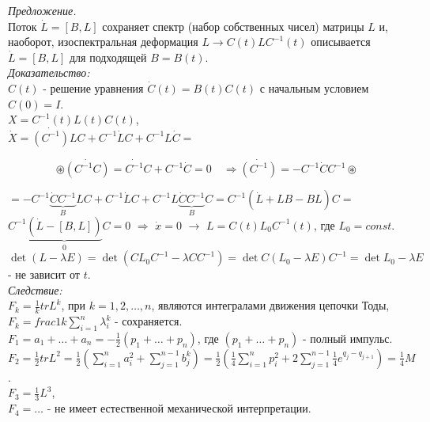 \documentclass[a4paper,12pt]{article}
\theoremstyle{definition}
\theoremstyle{definition}
\theoremstyle{definition}
\begin{document}
\textit{Предложение.}\\

Поток $\dot{L} = [B,L]$ сохраняет спектр  (набор собственных чисел) матрицы $L$
и, наоборот, изоспектральная деформация $L \rightarrow C(t)LC^{-1}(t)$ описывается $\dot{L} = [B,L]$ для подходящей $B = B(t)$.\\

\textit{Доказательство:}\\
$C(t)$ - решение уравнения $\dot{C}(t) =  B(t)C(t)$  с начальным условием $C(0) = I$.\\
$X = C^{-1}(t)L(t)C(t)$,\\
$\dot{X} = \dot{(C^{-1})}LC + C^{-1}\dot{L}C + C^{-1}L\dot{C} = $

\[\circledast \dot{\left(C^{-1}C\right)} = \dot{C^{-1}}C + C^{-1}\dot{C} = 0 \quad  \Rightarrow \dot{\left(C^{-1}\right)}  = -C^{-1}\dot{C}C^{-1} \circledast\]

$= -C^{-1}\underbrace{\dot{C}C^{-1}}_{B}LC + C^{-1}\dot{L}C + C^{-1}L\underbrace{\dot{C}C^{-1}}_{B}C = C^{-1}\left(\dot{L} + LB -BL\right)C = $\\
$C^{-1}\underbrace{\left(\dot{L} - [B,L]\right)}_{0}C = 0$ $\Rightarrow$ $\dot{x} = 0$ $\rightarrow$ $L = C(t)L_{0}C^{-1}(t)$, где $L_{0} = const$.\\
\[\det{(L - \lambda E)} = \det{\left(CL_{0}C^{-1} - \lambda C C^{-1}\right)} = \det{C(L_{0} - \lambda E)C^{-1}} = \det{L_{0} - \lambda E} \]
- не зависит от  $t$.\\


\textit{Следствие:}\\


$F_{k} = \frac{1}{k} tr{L}^{k}$, при $k=1,2, \ldots, n$, являются интегралами движения цепочки Тоды,\\
$F_{k} = \displaystyle{frac{1}{k}\sum^{n}_{i=1}\lambda^{k}_{i}}$ - сохраняется.\\
$F_{1} = a_{1} + \ldots + a_{n} = -\displaystyle\frac12 (p_{1} + \ldots + p_{n})$, где $(p_{1} + \ldots + p_{n})$ - полный импульс.\\
$F_{2} = \frac12 tr L^{2} = \displaystyle{\frac12 \left(\sum^{n}_{i=1} a^{2}_{i} + \sum^{n-1}_{j=1}b^{k}_{j}\right)} = \displaystyle{\frac12 \left( \frac14 \sum^{n}_{i=1}p^{2}_{i} + 2 \sum^{n-1}_{j=1}\frac14 e^{q_{j} - q_{j+1}}\right)} = \frac14 M$.\\
$F_{3} = \frac13 L^{3}$,\\
$F_{4} = \ldots $  - не имеет естественной механической интерпретации.\\
\end{document}
